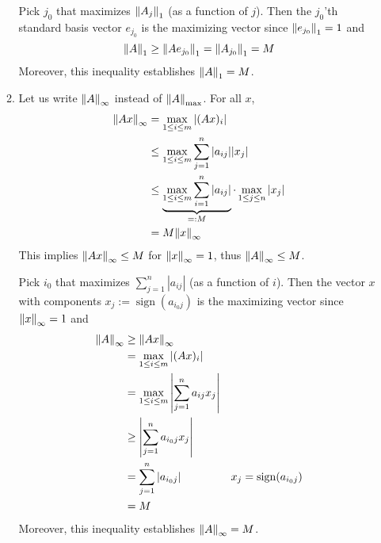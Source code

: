 \documentclass{article}
\DeclareMathOperator{\sign}{sign}
\begin{document}
\begin{enumerate}
\begin{enumerate}
		Pick $j_0$ that maximizes $\norm{A_j}_1$ (as a function of $j$). Then the $j_0$'th standard basis vector $e_{j_0}$ is the maximizing vector since $\norm{e_{j_0}}_1=1$ and
		\[\norm{A}_1 \ge \norm{Ae_{j_0}}_1
		= \norm{A_{j_0}}_1
		= M\]
		Moreover, this inequality establishes $\norm{A}_1=M$.
		
		
		
		\item Let us write $\norm{A}_\infty$ instead of $\norm{A}_\text{max}$. For all $x$,
		\begin{align*}
			\norm{Ax}_\infty &= \max_{1\le i\le m}|(Ax)_i| \\
			&\le \max_{1\le i\le m}\sum_{j=1}^n |a_{ij}||x_j| \\
			&\le \underbrace{\max_{1\le i\le m}\sum_{i=1}^n |a_{ij}|}_{=:M} \cdot \max_{1\le j\le n} |x_j| \\
			&= M\norm{x}_\infty
		\end{align*}
		This implies $\norm{Ax}_\infty \le M$ for $\norm{x}_\infty=1$, thus $\norm{A}_\infty\le M$.
		
		Pick $i_0$ that maximizes $\sum_{j=1}^n|a_{ij}|$ (as a function of $i$). Then the vector $x$ with components $x_j:=\sign(a_{i_0j})$ is the maximizing vector since $\norm{x}_\infty=1$ and
		\begin{align*}
			\norm{A}_\infty &\ge \norm{Ax}_\infty \\
			&= \max_{1\le i\le m}|(Ax)_i| \\
			&= \max_{1\le i\le m}\abs{\sum_{j=1}^n a_{ij}x_j} \\
			&\ge \abs{\sum_{j=1}^n a_{i_0j}x_j} \\
			&= \sum_{j=1}^n |a_{i_0j}| & x_j = \sign(a_{i_0j})\\
			&= M
		\end{align*}
		Moreover, this inequality establishes $\norm{A}_\infty=M$.
		
		
		
	\end{enumerate}
	
	
\end{enumerate}
	
	
\end{document}
